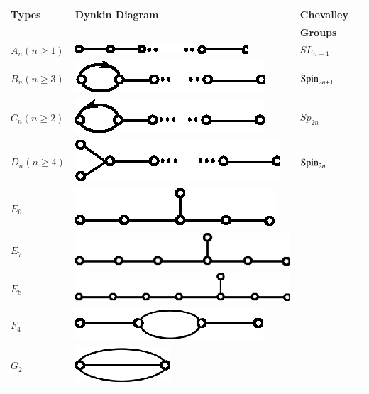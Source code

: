 \begin{center}
  \begin{tabular}{llll}
\textbf{Types} & \qquad \textbf{Dynkin Diagram} & \textbf{Chevalley}\\
& & \textbf{Groups}\\[5pt] 
$A_n (n \geq 1)$ & \qquad \includegraphics{figures/fig1.eps} & $SL_{n+1}$\\[5pt] 
$B_n (n \geq 3)$ & \qquad \includegraphics{figures/fig2.eps} & $\operatorname{Spin}_{2n+1}$\\[5pt] 
$C_n (n \geq 2)$ & \qquad \includegraphics{figures/fig3.eps} & $Sp_{2n}$\\[5pt] 
$D_n (n \geq 4)$ & \qquad \includegraphics{figures/fig4.eps} & $\operatorname{Spin}_{2n}$\\[5pt] 
$E_6$ & \qquad \includegraphics{figures/fig5.eps} & \\[5pt] 
$E_7$ & \qquad \includegraphics{figures/fig6.eps} & \\[5pt] 
$E_8$ & \qquad \includegraphics{figures/fig7.eps} & \\[5pt] 
$F_4$ & \qquad \includegraphics{figures/fig8.eps} & \\[5pt] 
$G_2$ & \qquad\includegraphics{figures/fig9.eps} & 
  \end{tabular}\pageoriginale
\end{center}

